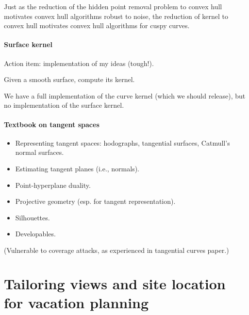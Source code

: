 \documentclass[11pt]{article}
\begin{document}
Just as the reduction of the hidden point removal problem to convex hull
motivates convex hull algorithms robust to noise,
the reduction of kernel to convex hull
motivates convex hull algorithms for cuspy curves.


\paragraph{Surface kernel}

Action item: implementation of my ideas (tough!).

Given a smooth surface, compute its kernel.

We have a full implementation of the curve kernel (which we should release),
but no implementation of the surface kernel.



\paragraph{Textbook on tangent spaces}

\begin{itemize}
\item Representing tangent spaces: hodographs, tangential surfaces, Catmull's normal surfaces.
\item Estimating tangent planes (i.e., normals).
\item Point-hyperplane duality.
\item Projective geometry (esp. for tangent representation).
\item Silhouettes.
\item Developables.
\end{itemize}

(Vulnerable to coverage attacks, as experienced in tangential curves paper.)


\clearpage

\section{Tailoring views and site location for vacation planning}
\end{document}
